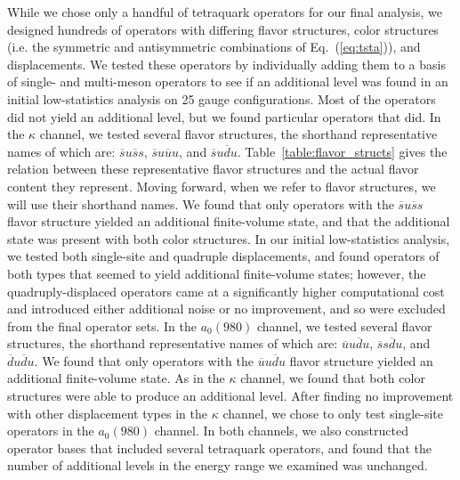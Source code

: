 While we chose only a handful of tetraquark operators for our final analysis, we designed hundreds of operators with differing flavor structures, color structures (i.e. the symmetric and antisymmetric combinations of Eq.~(\ref{eq:tsta})), and displacements. We tested these operators by individually adding them to a basis of single- and multi-meson operators to see if an additional level was found in an initial low-statistics analysis on 25 gauge configurations. Most of the operators did not yield an additional level, but we found particular operators that did. In the $\kappa$ channel, we tested several flavor structures, the shorthand representative names of which are: $\overline s u \overline s s$, $\overline s u \overline u u$, and $\overline s u \overline d u$. Table~\ref{table:flavor_structs} gives the relation between these representative flavor structures and the actual flavor content they represent. Moving forward, when we refer to flavor structures, we will use their shorthand names. We found that only operators with the $\overline s u \overline s s$ flavor structure yielded an additional finite-volume state, and that the additional state was present with both color structures. In our initial low-statistics analysis, we tested both single-site and quadruple displacements, and found operators of both types that seemed to yield additional finite-volume states; however, the quadruply-displaced operators came at a significantly higher computational cost and introduced either additional noise or no improvement, and so were excluded from the final operator sets. In the $a_0(980)$ channel, we tested several flavor structures, the shorthand representative names of which are: $\overline u u \overline d u$, $\overline s s \overline d u$, and $\overline d u \overline d u$. We found that only operators with the $\overline u u \overline d u$ flavor structure yielded an additional finite-volume state. As in the $\kappa$ channel, we found that both color structures were able to produce an additional level. After finding no improvement with other displacement types in the $\kappa$ channel, we chose to only test single-site operators in the $a_0(980)$ channel. In both channels, we also constructed operator bases that included several tetraquark operators, and found that the number of additional levels in the energy range we examined was unchanged.

